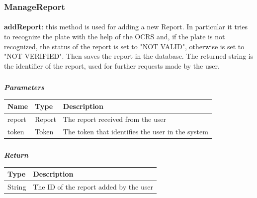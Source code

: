 				\subsubsection{ManageReport}
					\paragraph{}
							\textbf{addReport}: this method is used for adding a new Report. In particular it tries to recognize the  plate with the help of the OCRS and, if the plate is not recognized, the status of the report is set to "NOT VALID", otherwise is set to "NOT VERIFIED". Then saves the report in the database. The returned string is the identifier of the report, used for further requests made by the user. 
							\subparagraph{}
							\vspace{-3mm}
							\textit{\textbf{Parameters}}
							\vspace{-2mm}
								\begin{table}[!h]
									\begin{tabular}{L{0.15\textwidth}L{0.15\textwidth}L{0.5\textwidth}}
										\toprule
										\textbf{Name} & \textbf{Type} & \textbf{Description} \\
										\midrule
								  		report & Report & The report received from the user \\
								  		token & Token & The token that identifies the user in the system \\
								 		\bottomrule
									\end{tabular}
								\end{table}
							\subparagraph{}
							\vspace{-6mm}
								\textit{\textbf{Return}}
								\vspace{-2mm}
									\begin{table}[!h]
									\begin{tabular}{L{0.15\textwidth}L{0.65\textwidth}}
										\toprule
										\textbf{Type} & \textbf{Description} \\
										\midrule
								  		String & The ID of the report added by the user \\
								 		\bottomrule
									\end{tabular}
								\end{table}
					
